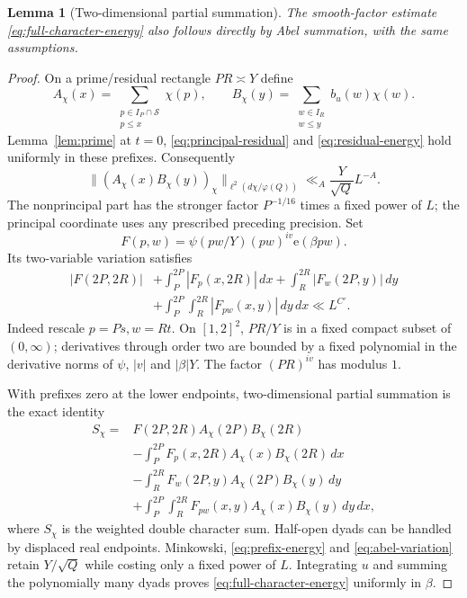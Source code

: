 \documentclass[11pt]{article}
\newtheorem{lemma}[theorem]{Lemma}
\theoremstyle{definition}
\newcommand{\e}{\mathrm e}
\newcommand{\Sset}{\mathcal S}
\theoremstyle{remark}
\begin{document}
\begin{lemma}[Two-dimensional partial summation]\label{lem:abel}
The smooth-factor estimate \eqref{eq:full-character-energy} also
follows directly by Abel summation, with the same assumptions.
\end{lemma}
\begin{proof}
On a prime/residual rectangle $PR\asymp Y$ define
\begin{equation}\label{eq:abel-prefixes}
A_\chi(x)=\sum_{\substack{p\in I_P\cap\Sset\\p\le x}}\chi(p),
\qquad
B_\chi(y)=\sum_{\substack{w\in I_R\\w\le y}}b_u(w)\chi(w).
\end{equation}
Lemma~\ref{lem:prime} at $t=0$, \eqref{eq:principal-residual}
and \eqref{eq:residual-energy} hold uniformly in these prefixes.
Consequently
\begin{equation}\label{eq:prefix-energy}
\|(A_\chi(x)B_\chi(y))_\chi\|_{\ell^2(d\chi/\varphi(Q))}
\ll_A \frac{Y}{\sqrt Q}L^{-A}.
\end{equation}
The nonprincipal part has the stronger factor
$P^{-1/16}$ times a fixed power of $L$; the principal coordinate
uses any prescribed preceding precision.
Set
\begin{equation}\label{eq:abel-factor}
F(p,w)=\psi(pw/Y)(pw)^{iv}\e(\beta pw).
\end{equation}
Its two-variable variation satisfies
\begin{equation}\label{eq:abel-variation}
\begin{split}
|F(2P,2R)|&
+\int_P^{2P}|F_p(x,2R)|\,dx
+\int_R^{2R}|F_w(2P,y)|\,dy\\
&+\int_P^{2P}\int_R^{2R}|F_{pw}(x,y)|\,dy\,dx
\ll L^{C'}.
\end{split}
\end{equation}
Indeed rescale $p=Ps,w=Rt$. On $[1,2]^2$, $PR/Y$ is in a fixed
compact subset of $(0,\infty)$; derivatives through order two are
bounded by a fixed polynomial in the derivative norms of $\psi$,
$|v|$ and $|\beta|Y$. The factor $(PR)^{iv}$ has modulus $1$.

With prefixes zero at the lower endpoints, two-dimensional partial
summation is the exact identity
\begin{equation}\label{eq:abel-identity}
\begin{split}
S_\chi={}&F(2P,2R)A_\chi(2P)B_\chi(2R)\\
&-\int_P^{2P}F_p(x,2R)A_\chi(x)B_\chi(2R)\,dx\\
&-\int_R^{2R}F_w(2P,y)A_\chi(2P)B_\chi(y)\,dy\\
&+\int_P^{2P}\int_R^{2R}
       F_{pw}(x,y)A_\chi(x)B_\chi(y)\,dy\,dx,
\end{split}
\end{equation}
where $S_\chi$ is the weighted double character sum.
Half-open dyads can be handled by displaced real endpoints.
Minkowski, \eqref{eq:prefix-energy} and \eqref{eq:abel-variation}
retain $Y/\sqrt Q$ while costing only a fixed power of $L$.
Integrating $u$ and summing the polynomially many dyads proves
\eqref{eq:full-character-energy} uniformly in $\beta$.
\end{proof}
\end{document}
